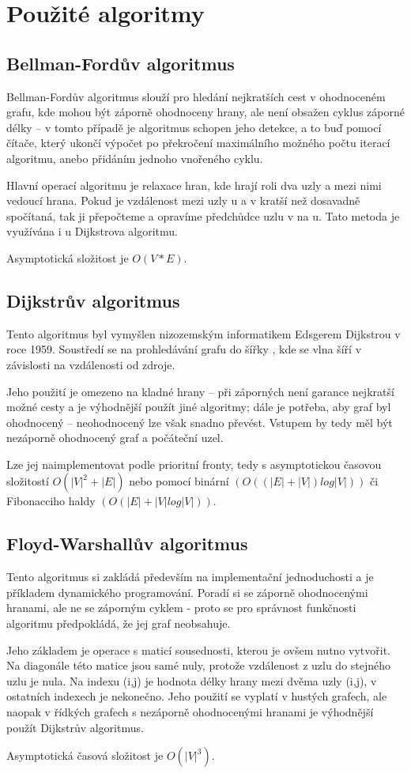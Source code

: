 \documentclass[a4paper,11pt]{article}
\begin{document}
\section{Použité algoritmy}
\subsection{Bellman-Fordův algoritmus}
Bellman-Fordův algoritmus slouží pro hledání nejkratších cest v ohodnoceném grafu, kde mohou být záporně ohodnoceny hrany, ale není obsažen cyklus záporné délky – v tomto případě je algoritmus schopen jeho detekce, a to buď pomocí čítače, který ukončí výpočet po překročení maximálního možného počtu iterací algoritmu, anebo přidáním jednoho vnořeného cyklu.
\par
Hlavní operací algoritmu je relaxace hran, kde hrají roli dva uzly a mezi nimi vedoucí hrana. Pokud je vzdálenost mezi uzly u a v kratší než dosavadně spočítaná, tak ji přepočteme a opravíme předchůdce uzlu v na u. Tato metoda je využívána i u Dijkstrova algoritmu.
\par
Asymptotická složitost je $O(V*E)$.

\subsection{Dijkstrův algoritmus}
Tento algoritmus byl vymyšlen nizozemským informatikem Edsgerem Dijkstrou v roce 1959. Soustředí se na prohledávání grafu do šířky , kde se vlna šíří v závislosti na vzdálenosti od zdroje.
\par
Jeho použití je omezeno na kladné hrany – při záporných není garance nejkratší možné cesty a je výhodnější použít jiné algoritmy; dále je potřeba, aby graf byl ohodnocený – neohodnocený lze však snadno převést. Vstupem by tedy měl být nezáporně ohodnocený graf a počáteční uzel.
\par
Lze jej naimplementovat podle prioritní fronty, tedy s asymptotickou časovou složitostí $O(|V|^2+|E|)$ nebo pomocí binární $(O((|E|+|V|)log|V|))$ či Fibonacciho haldy $(O(|E|+|V|log|V|))$.

\subsection{Floyd-Warshallův algoritmus}
Tento algoritmus si zakládá především na implementační jednoduchosti a je příkladem dynamického programování. Poradí si se záporně ohodnocenými hranami, ale ne se záporným cyklem - proto se pro správnost funkčnosti algoritmu předpokládá, že jej graf neobsahuje.
\par
Jeho základem je operace s maticí sousednosti, kterou je ovšem nutno vytvořit. Na diagonále této matice jsou samé nuly, protože vzdálenost z uzlu do stejného uzlu je nula. Na indexu (i,j) je hodnota délky hrany mezi dvěma uzly (i,j), v ostatních indexech je nekonečno. Jeho použití se vyplatí v hustých grafech, ale naopak v řídkých grafech s nezáporně ohodnocenými hranami je výhodnější použít Dijkstrův algoritmus.
\par
Asymptotická časová složitost je $O(|V|^3)$.
\end{document}

